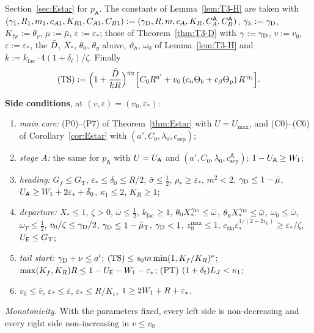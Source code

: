 Section~\ref{sec:Estar} for $p_{\mathsf A}$. The constants of Lemma~\ref{lem:T3-H} are taken with
$(\gamma_1,R_1,m_1,c_{A1},K_{R1},C_{A1},C_{B1}):=(\gamma_{\mathrm D},R,m,c_A,K_R,C_A^{\mathsf A},C_B^{\mathsf A})$, $\gamma_h:=\gamma_{\mathrm D}$,
$K_{\mathrm{fw}}:=\theta_v$, $\mu:=\bar\mu$, $\varepsilon:=\varepsilon_*$; those of Theorem~\ref{thm:T3-D} with $\gamma:=\gamma_{\mathrm D}$,
$v:=v_0$, $\varepsilon:=\varepsilon_*$, the $\bar D$, $X_*$, $\theta_0$, $\theta_y$ above, $\vartheta_h$, $\omega_0$ of
Lemma~\ref{lem:T3-H} and $k:=k_{\mathrm{fac}}\cdot4(1+\delta_t)/\zeta$. Finally
\begin{equation}\label{eq:T3-TS}
\textup{(TS)}:=\Bigl(1+\frac{\bar D}{kR}\Bigr)^{\eta_{\mathrm N}}\Bigl[C_0R^{a'}+v_0\,(c_n\Theta_b+c_\beta\Theta_{\mathrm p})\,R^{\gamma_{\mathrm D}}\Bigr].
\end{equation}

\noindent\textbf{Side conditions}, at $(v,\varepsilon)=(v_0,\varepsilon_*)$:
\begin{enumerate}
\item[(i)] \emph{main core:} (P0)--(P7) of Theorem~\ref{thm:Estar} with $U=U_{\max}$, and (C0)--(C6) of Corollary~\ref{cor:Estar}
with $(a',C_0,\lambda_0,c_{\mathrm{sep}})$;
\item[(ii)] \emph{stage A:} the same for $p_{\mathsf A}$ with $U=U_{\mathsf A}$ and $(a',C_0,\lambda_0,c_{\mathrm{sep}}^{\mathsf A})$;
$1-U_{\mathsf A}\ge W_1$;
\item[(iii)] \emph{heading:} $G_f\le G_{\mathrm T}$, $\varepsilon_*\le\delta_0\le R/2$, $\bar\sigma\le\frac12$, $\rho_*\ge\varepsilon_*$,
$m^2<2$, $\gamma_{\mathrm D}\le1-\bar\mu$, $U_{\mathsf A}\ge W_1+2\varepsilon_*+\delta_0$, $\kappa_1\le2$, $K_R\ge1$;
\item[(iv)] \emph{departure:} $X_*\le1$, $\zeta>0$, $\bar\omega\le\frac12$, $k_{\mathrm{fac}}\ge1$, $\theta_0X_*^{\gamma_{\mathrm D}}\le\bar\omega$,
$\theta_yX_*^{\gamma_{\mathrm D}}\le\bar\omega$, $\omega_0\le\bar\omega$, $\omega_T\le\frac12$, $v_0/\zeta\le\gamma_{\mathrm D}/2$,
$\gamma_{\mathrm D}\le1-\bar\mu_{\mathrm T}$, $\gamma_{\mathrm D}<1$, $z_0^{\max}\le1$, $c_{\mathrm{zlo}}\varepsilon_*^{1/(2-2v_0)}\ge\varepsilon_*/\zeta$,
$U_{\mathsf E}\le G_{\mathrm T}$;
\item[(v)] \emph{tail start:} $\gamma_{\mathrm D}+\nu\le a'$; $\textup{(TS)}\le s_0m\min(1,K_f/K_R)^\nu$;
$\max(K_f,K_R)R\le1-U_{\mathsf E}-W_1-\varepsilon_*$; \textup{(PT)} $(1+\delta_t)L_J<\kappa_1$;
\item[(vi)] $v_0\le\bar v$, $\varepsilon_*\le\bar\varepsilon$, $\varepsilon_*\le R/K_\varepsilon$, $1\ge2W_1+R+\varepsilon_*$.
\end{enumerate}
\emph{Monotonicity.} With the parameters fixed, every left side is non-decreasing and every right side non-increasing in $v\le v_0$
